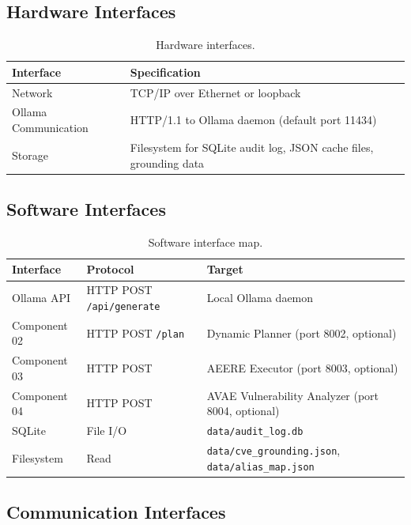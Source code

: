﻿\documentclass[10pt,journal,onecolumn]{IEEEtran}
\begin{document}
\subsection{Hardware Interfaces}
\begin{table}[h]
\caption{Hardware interfaces.}
\label{tab:hwinterface}
\begin{tabularx}{\columnwidth}{l X}
\toprule
\textbf{Interface} & \textbf{Specification}\\
\midrule
Network & TCP/IP over Ethernet or loopback\\
Ollama Communication & HTTP/1.1 to Ollama daemon (default port 11434)\\
Storage & Filesystem for SQLite audit log, JSON cache files, grounding data\\
\bottomrule
\end{tabularx}
\end{table}

\subsection{Software Interfaces}
\begin{table}[t]
\caption{Software interface map.}
\label{tab:swinterfaces}
\begin{tabularx}{\textwidth}{l l X}
\toprule
\textbf{Interface} & \textbf{Protocol} & \textbf{Target}\\
\midrule
Ollama API & HTTP POST \texttt{/api/generate} & Local Ollama daemon\\
Component 02 & HTTP POST \texttt{/plan} & Dynamic Planner (port 8002, optional)\\
Component 03 & HTTP POST & AEERE Executor (port 8003, optional)\\
Component 04 & HTTP POST & AVAE Vulnerability Analyzer (port 8004, optional)\\
SQLite & File I/O & \texttt{data/audit\_log.db}\\
Filesystem & Read & \texttt{data/cve\_grounding.json}, \texttt{data/alias\_map.json}\\
\bottomrule
\end{tabularx}
\end{table}

\subsection{Communication Interfaces}
\end{document}
